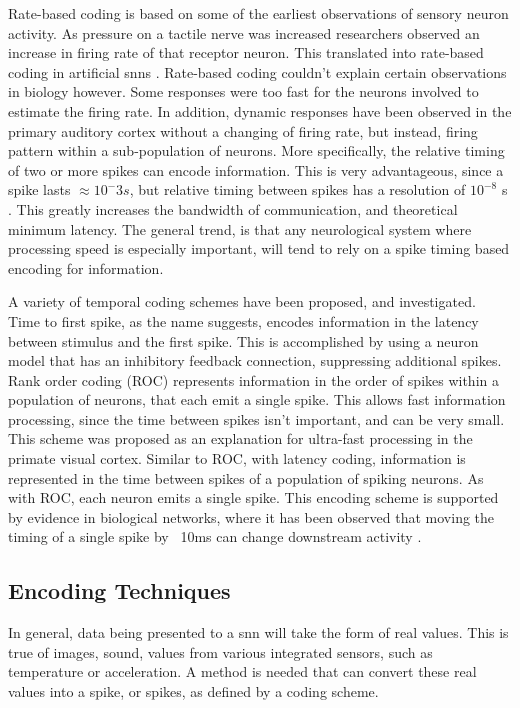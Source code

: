     Rate-based coding is based on some of the earliest observations of sensory
    neuron activity. As pressure on a tactile nerve was increased researchers
    observed an increase in firing rate of that receptor neuron. This translated
    into rate-based coding in artificial \glspl{snn} \parencite{ponulak_2011}. Rate-based
    coding couldn't explain certain observations in biology however. Some
    responses were too fast for the neurons involved to estimate the firing
    rate. In addition, dynamic responses have been observed in the primary
    auditory cortex without a changing of firing rate, but instead, firing
    pattern within a sub-population of neurons. More specifically, the relative
    timing of two or more spikes can encode information. This is very
    advantageous, since a spike lasts $\approx 10^-3s$, but relative timing
    between spikes has a resolution of $10^{-8}$ s \parencite{ponulak_2011}. This
    greatly increases the bandwidth of communication, and theoretical minimum
    latency. The general trend, is that any neurological system where processing
    speed is especially important, will tend to rely on a spike timing based
    encoding for information.
    
    A variety of temporal coding schemes have been proposed, and
    investigated. Time to first spike, as the name suggests, encodes information
    in the latency between stimulus and the first spike. This is accomplished by
    using a neuron model that has an inhibitory feedback connection, suppressing
    additional spikes. Rank order coding (ROC) represents information in the
    order of spikes within a population of neurons, that each emit a single
    spike. This allows fast information processing, since the time between
    spikes isn't important, and can be very small. This scheme was proposed as
    an explanation for ultra-fast processing in the primate visual
    cortex. Similar to ROC, with latency coding, information is represented in
    the time between spikes of a population of spiking neurons. As with ROC,
    each neuron emits a single spike. This encoding scheme is supported by
    evidence in biological networks, where it has been observed that moving the
    timing of a  single spike by ~10ms can change downstream activity
    \parencite{ponulak_2011}.
        
    \subsection{Encoding Techniques}
    In general, data being presented to a \gls{snn} will take the form of real
    values. This is true of images, sound, values from various integrated
    sensors, such as temperature or acceleration. A method is needed that can
    convert these real values into a spike, or spikes, as defined by a coding
    scheme.
    

